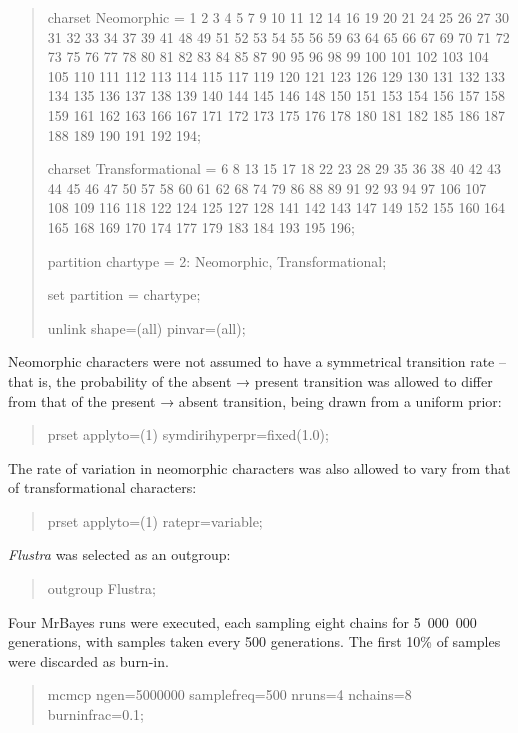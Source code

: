 \documentclass[openany]{book}
\theoremstyle{definition}
\theoremstyle{definition}
\theoremstyle{definition}
\theoremstyle{remark}
\begin{document}
\begin{quote}
charset Neomorphic = 1 2 3 4 5 7 9 10 11 12 14 16 19 20 21 24 25 26 27
30 31 32 33 34 37 39 41 48 49 51 52 53 54 55 56 59 63 64 65 66 67 69 70
71 72 73 75 76 77 78 80 81 82 83 84 85 87 90 95 96 98 99 100 101 102 103
104 105 110 111 112 113 114 115 117 119 120 121 123 126 129 130 131 132
133 134 135 136 137 138 139 140 144 145 146 148 150 151 153 154 156 157
158 159 161 162 163 166 167 171 172 173 175 176 178 180 181 182 185 186
187 188 189 190 191 192 194;

charset Transformational = 6 8 13 15 17 18 22 23 28 29 35 36 38 40 42 43
44 45 46 47 50 57 58 60 61 62 68 74 79 86 88 89 91 92 93 94 97 106 107
108 109 116 118 122 124 125 127 128 141 142 143 147 149 152 155 160 164
165 168 169 170 174 177 179 183 184 193 195 196;

partition chartype = 2: Neomorphic, Transformational;

set partition = chartype;

unlink shape=(all) pinvar=(all);
\end{quote}

Neomorphic characters were not assumed to have a symmetrical transition
rate -- that is, the probability of the absent → present transition was
allowed to differ from that of the present → absent transition, being
drawn from a uniform prior:

\begin{quote}
prset applyto=(1) symdirihyperpr=fixed(1.0);
\end{quote}

The rate of variation in neomorphic characters was also allowed to vary
from that of transformational characters:

\begin{quote}
prset applyto=(1) ratepr=variable;
\end{quote}

\emph{Flustra} was selected as an outgroup:

\begin{quote}
outgroup Flustra;
\end{quote}

Four MrBayes runs were executed, each sampling eight chains for
5~000~000 generations, with samples taken every 500 generations. The
first 10\% of samples were discarded as burn-in.

\begin{quote}
mcmcp ngen=5000000 samplefreq=500 nruns=4 nchains=8 burninfrac=0.1;
\end{quote}
\end{document}
